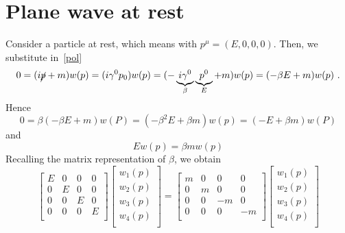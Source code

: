 \section{Plane wave at rest}

    \begin{example}
        Consider a particle at rest, which means with $p^\mu = (E,0,0,0)$. Then, we substitute in~\eqref{pol}
        \begin{equation*}
            0  = (i \cancel p + m)w(p) = (i \gamma^0 p_0) w(p) = (- \underbrace{i \gamma^0}_{\beta} \underbrace{p^0}_E + m) w(p) = (- \beta E + m) w(p) ~.
        \end{equation*}
        Hence 
        \begin{equation*}
            0 = \beta (- \beta E + m) w(P) = (- \beta^2 E + \beta m) w(p) = (- E + \beta m) w(P)
        \end{equation*}
        and 
        \begin{equation*}
            E w(p) = \beta m w(p)
        \end{equation*}
        Recalling the matrix representation of $\beta$, we obtain 
        \begin{equation*}
            \begin{bmatrix}
                E & 0 & 0 & 0 \\
                0 & E & 0 & 0 \\
                0 & 0 & E & 0 \\
                0 & 0 & 0 & E \\
            \end{bmatrix} 
            \begin{bmatrix}
                w_1(p) \\ w_2(p) \\ w_3(p) \\ w_4(p) \\
            \end{bmatrix} = 
            \begin{bmatrix}
                m & 0 & 0 & 0 \\
                0 & m & 0 & 0 \\
                0 & 0 & -m & 0 \\
                0 & 0 & 0 & -m \\
            \end{bmatrix}
            \begin{bmatrix}
                w_1(p) \\ w_2(p) \\ w_3(p) \\ w_4(p) \\ 

\end{bmatrix}
\end{equation*}
\end{example}
